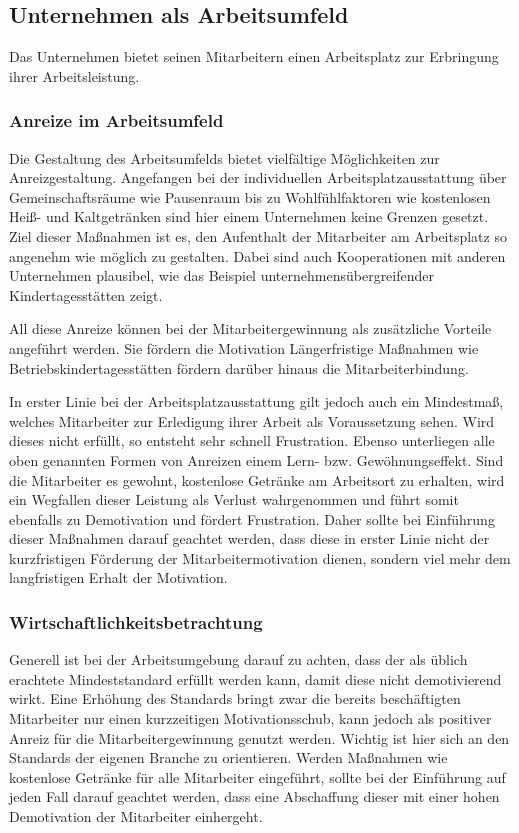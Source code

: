 \subsection{Unternehmen als Arbeitsumfeld}
Das Unternehmen bietet seinen Mitarbeitern einen Arbeitsplatz zur Erbringung ihrer Arbeitsleistung. 

\subsubsection{Anreize im Arbeitsumfeld}
Die Gestaltung des Arbeitsumfelds bietet vielfältige Möglichkeiten zur Anreizgestaltung. Angefangen bei der individuellen Arbeitsplatzausstattung über Gemeinschaftsräume wie Pausenraum bis zu Wohlfühlfaktoren wie kostenlosen Heiß- und Kaltgetränken sind hier einem Unternehmen keine Grenzen gesetzt. Ziel dieser Maßnahmen ist es, den Aufenthalt der Mitarbeiter am Arbeitsplatz so angenehm wie möglich zu gestalten. Dabei sind auch Kooperationen mit anderen Unternehmen plausibel, wie das Beispiel unternehmensübergreifender Kindertagesstätten zeigt. 

All diese Anreize können bei der Mitarbeitergewinnung als zusätzliche Vorteile angeführt werden. Sie fördern die Motivation  Längerfristige Maßnahmen wie Betriebskindertagesstätten fördern darüber hinaus die Mitarbeiterbindung. 

In erster Linie bei der Arbeitsplatzausstattung gilt jedoch auch ein Mindestmaß, welches Mitarbeiter zur Erledigung ihrer Arbeit als Voraussetzung sehen. Wird dieses nicht erfüllt, so entsteht sehr schnell Frustration. Ebenso unterliegen alle oben genannten Formen von Anreizen einem Lern- bzw. Gewöhnungseffekt. Sind die Mitarbeiter es gewohnt, kostenlose Getränke am Arbeitsort zu erhalten, wird ein Wegfallen dieser Leistung als Verlust wahrgenommen und führt somit ebenfalls zu Demotivation und fördert Frustration. Daher sollte bei Einführung dieser Maßnahmen darauf geachtet werden, dass diese in erster Linie nicht der kurzfristigen Förderung der Mitarbeitermotivation dienen, sondern viel mehr dem langfristigen Erhalt der Motivation.

\subsubsection{Wirtschaftlichkeitsbetrachtung}
Generell ist bei der Arbeitsumgebung darauf zu achten, dass der als üblich erachtete Mindeststandard erfüllt werden kann, damit diese nicht demotivierend wirkt. Eine Erhöhung des Standards bringt zwar die bereits beschäftigten Mitarbeiter nur einen kurzzeitigen Motivationsschub, kann jedoch als positiver Anreiz für die Mitarbeitergewinnung genutzt werden. Wichtig ist hier sich an den Standards der eigenen Branche zu orientieren. Werden Maßnahmen wie kostenlose Getränke für alle Mitarbeiter eingeführt, sollte bei der Einführung auf jeden Fall darauf geachtet werden, dass eine Abschaffung dieser mit einer hohen Demotivation der Mitarbeiter einhergeht.